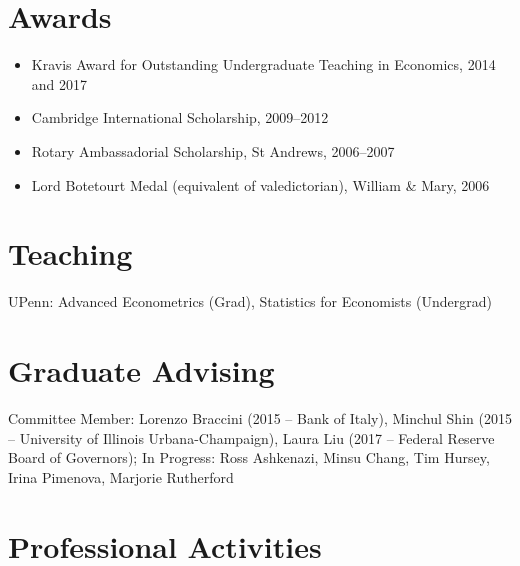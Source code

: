 \documentclass[line,overlapped]{myres}
\begin{document}
\begin{resume}
\section{\sc Awards}
\vspace{1em}
\begin{itemize}
\item Kravis Award for Outstanding Undergraduate Teaching in Economics, 2014 and 2017
\item Cambridge International Scholarship, 2009--2012
\item Rotary Ambassadorial Scholarship, St Andrews, 2006--2007
\item Lord Botetourt Medal (equivalent of valedictorian), William \& Mary, 2006
\end{itemize}

\section{\sc Teaching }
\vspace{0.5em}
	UPenn: Advanced Econometrics (Grad), Statistics for Economists (Undergrad)
	


\section{\sc Graduate Advising}
\vspace{0.5em}
Committee Member: Lorenzo Braccini (2015 -- Bank of Italy), Minchul Shin (2015 -- University of Illinois Urbana-Champaign), Laura Liu (2017 -- Federal Reserve Board of Governors); In Progress: Ross Ashkenazi, Minsu Chang, Tim Hursey, Irina Pimenova, Marjorie Rutherford


\section{\sc Professional Activities}


\end{resume}
\end{document}
